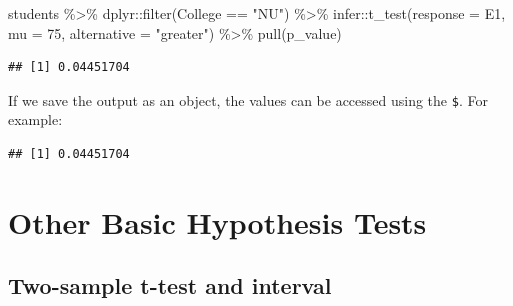 \documentclass[
]{book}
\newenvironment{Shaded}{\begin{snugshade}}{\end{snugshade}}
\newcommand{\AttributeTok}[1]{\textcolor[rgb]{0.77,0.63,0.00}{#1}}
\newcommand{\DecValTok}[1]{\textcolor[rgb]{0.00,0.00,0.81}{#1}}
\newcommand{\FunctionTok}[1]{\textcolor[rgb]{0.00,0.00,0.00}{#1}}
\newcommand{\NormalTok}[1]{#1}
\newcommand{\OtherTok}[1]{\textcolor[rgb]{0.56,0.35,0.01}{#1}}
\newcommand{\SpecialCharTok}[1]{\textcolor[rgb]{0.00,0.00,0.00}{#1}}
\newcommand{\StringTok}[1]{\textcolor[rgb]{0.31,0.60,0.02}{#1}}
\begin{document}
\begin{Shaded}
\begin{Highlighting}[]
\NormalTok{students }\SpecialCharTok{\%\textgreater{}\%} 
\NormalTok{  dplyr}\SpecialCharTok{::}\FunctionTok{filter}\NormalTok{(College }\SpecialCharTok{==} \StringTok{"NU"}\NormalTok{) }\SpecialCharTok{\%\textgreater{}\%} 
\NormalTok{  infer}\SpecialCharTok{::}\FunctionTok{t\_test}\NormalTok{(}\AttributeTok{response =}\NormalTok{ E1, }\AttributeTok{mu =} \DecValTok{75}\NormalTok{, }\AttributeTok{alternative =} \StringTok{"greater"}\NormalTok{) }\SpecialCharTok{\%\textgreater{}\%} 
  \FunctionTok{pull}\NormalTok{(p\_value)}
\end{Highlighting}
\end{Shaded}

\begin{verbatim}
## [1] 0.04451704
\end{verbatim}

If we save the output as an object, the values can be accessed using the \texttt{\$}. For example:

\begin{Shaded}
\end{Shaded}

\begin{verbatim}
## [1] 0.04451704
\end{verbatim}

\hypertarget{other-hypothesis-tests}{%
\section{Other Basic Hypothesis Tests}\label{other-hypothesis-tests}}

\hypertarget{two-sample-t-test-and-interval}{%
\subsection{Two-sample t-test and interval}\label{two-sample-t-test-and-interval}}
\end{document}
